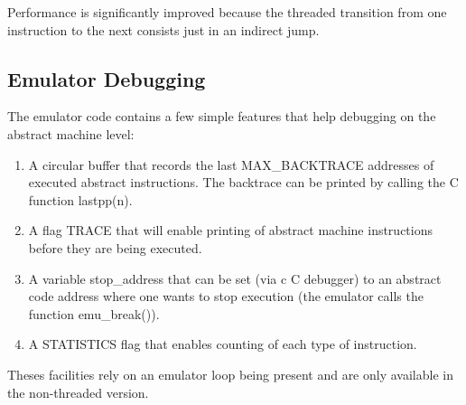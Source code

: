 Performance is significantly improved because the threaded transition
from one instruction to the next consists just in an indirect jump.


\subsection{Emulator Debugging}

The emulator  code contains a few simple features that help debugging
on the abstract machine level:
\begin{enumerate}
\item A circular buffer that records
the last MAX_BACKTRACE addresses of executed abstract instructions.
The backtrace can be printed by calling the C function lastpp(n).
\item A flag TRACE that will enable printing of abstract machine
instructions before they are being executed.
\item A variable stop_address that can be set (via c C debugger)
to an abstract code address where one wants to stop execution
(the emulator calls the function emu_break()).
\item A STATISTICS flag that enables counting of each
type of instruction.
\end{enumerate}
Theses facilities rely on an emulator loop being present and
are only available in the non-threaded version.

